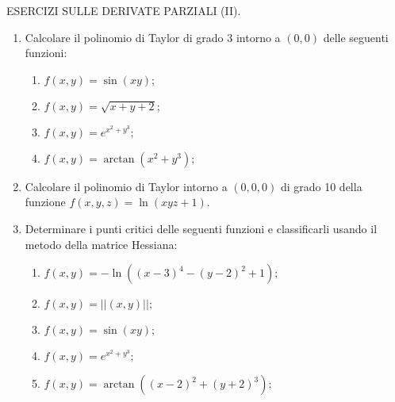 \pagestyle{empty}

\centerline{\Large ESERCIZI SULLE DERIVATE PARZIALI (II).}
\bigskip\bigskip

\begin{enumerate}
\item Calcolare il polinomio di Taylor di grado 3 intorno a $(0,0)$ delle
seguenti funzioni:
\begin{enumerate}
\item $f(x,y)=\sin(xy);$
\item $f(x,y)=\sqrt{x+y+2};$
\item $f(x,y)=e^{x^2+y^3};$
\item $f(x,y)=\arctan(x^2+y^3);$
\end{enumerate}
\item Calcolare il polinomio di Taylor intorno a $(0,0,0)$ di grado 10
della funzione $f(x,y,z)=\ln(xyz+1)$.
\item Determinare i punti critici delle seguenti funzioni e classificarli
usando il metodo della matrice Hessiana:
\begin{enumerate}
\item $f(x,y)=-\ln{((x-3)^4-(y-2)^2+1)};$
\item $f(x,y)=||(x,y)||;$
\item $f(x,y)=\sin(xy);$
\item $f(x,y)=e^{x^2+y^3};$
\item $f(x,y)=\arctan((x-2)^2+(y+2)^3);$
\end{enumerate}
\end{enumerate}
